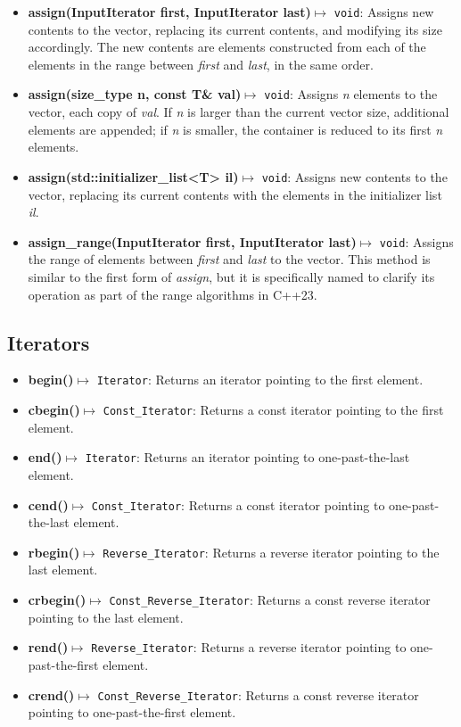 \documentclass{report}
\begin{document}
\begin{itemize}
        \item \textbf{assign(InputIterator first, InputIterator last)}$\mapsto$ \texttt{void}: Assigns new contents to the vector, replacing its current contents, and modifying its size accordingly. The new contents are elements constructed from each of the elements in the range between \textit{first} and \textit{last}, in the same order.
        \item \textbf{assign(size\_type n, const T\& val)}$\mapsto$ \texttt{void}: Assigns \textit{n} elements to the vector, each copy of \textit{val}. If \textit{n} is larger than the current vector size, additional elements are appended; if \textit{n} is smaller, the container is reduced to its first \textit{n} elements.
        \item \textbf{assign(std::initializer\_list<T> il)}$\mapsto$ \texttt{void}: Assigns new contents to the vector, replacing its current contents with the elements in the initializer list \textit{il}.
        \item \textbf{assign\_range(InputIterator first, InputIterator last)}$\mapsto$ \texttt{void}: Assigns the range of elements between \textit{first} and \textit{last} to the vector. This method is similar to the first form of \textit{assign}, but it is specifically named to clarify its operation as part of the range algorithms in C++23.
    \end{itemize}

    \bigbreak \noindent 
    \subsection{Iterators}
    \bigbreak \noindent 
    \begin{itemize}
        \item \textbf{begin()}\(\mapsto\) \texttt{Iterator}: Returns an iterator pointing to the first element.
        \item \textbf{cbegin()}\(\mapsto\) \texttt{Const\_Iterator}: Returns a const iterator pointing to the first element.
        \item \textbf{end()}\(\mapsto\) \texttt{Iterator}: Returns an iterator pointing to one-past-the-last element.
        \item \textbf{cend()}\(\mapsto\) \texttt{Const\_Iterator}: Returns a const iterator pointing to one-past-the-last element.
        \item \textbf{rbegin()}\(\mapsto\) \texttt{Reverse\_Iterator}: Returns a reverse iterator pointing to the last element.
        \item \textbf{crbegin()}\(\mapsto\) \texttt{Const\_Reverse\_Iterator}: Returns a const reverse iterator pointing to the last element.
        \item \textbf{rend()}\(\mapsto\) \texttt{Reverse\_Iterator}: Returns a reverse iterator pointing to one-past-the-first element.
        \item \textbf{crend()}\(\mapsto\) \texttt{Const\_Reverse\_Iterator}: Returns a const reverse iterator pointing to one-past-the-first element.
    \end{itemize}
\end{document}

